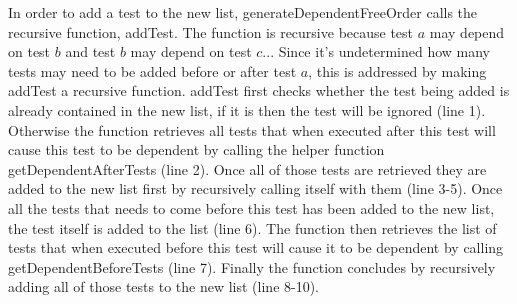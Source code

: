 In order to add a test to the new list, generateDependentFreeOrder calls
the recursive function, addTest. The function is recursive
because test $\mathit{a}$ may depend on test $\mathit{b}$ and test
$\mathit{b}$ may depend on test $\mathit{c}$... Since it's
undetermined how many tests may need to be added before or after
test $\mathit{a}$, this is addressed by making addTest
a recursive function. addTest first checks whether the test
being added is already contained in the new list, if it is then the
test will be ignored (line 1). Otherwise the function retrieves all
tests that when executed after this test will cause this test to be
dependent by calling the helper function getDependentAfterTests (line 2). 
Once all of those tests are retrieved they are added to the new list first
by recursively calling itself with them (line 3-5). Once all
the tests that needs to come before this test has been added to
the new list, the test itself is added to the list (line 6). The
function then retrieves the list of tests that when executed
before this test will cause it to be dependent by calling
getDependentBeforeTests (line 7). Finally the function
concludes by recursively adding all of those tests to the
new list (line 8-10).     












